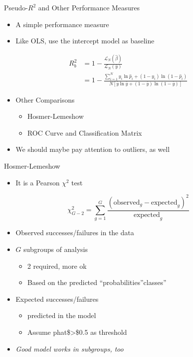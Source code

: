 \documentclass[
  ignorenonframetext,
]{beamer}
\providecommand{\tightlist}{%
  \setlength{\itemsep}{0pt}\setlength{\parskip}{0pt}}
\begin{document}
\begin{frame}{Pseudo-\(R^2\) and Other Performance Measures}
\protect{}\label{pseudo-r2-and-other-performance-measures}
\begin{itemize}
\tightlist
\item
  A simple performance measure
\item
  Like OLS, use the intercept model as baseline
\end{itemize}

\[
\begin{split}
R^2_{b} &=
1-\frac{ \mathcal{L}_N ( \hat{ \beta} )} {\mathcal{L}_N (\overline{y})} \\
 &= 1 - \frac{ \sum_{i=1}^N y_i \ln \hat{p}_i + (1-y_i) \ln
 (1-\hat{p}_i)} {N [ \overline{y} \ln \overline{y} +(1- \overline{y})
 \ln (1-\overline{y} )] }
\end{split}
\]

\begin{itemize}
\tightlist
\item
  Other Comparisons

  \begin{itemize}
  \tightlist
  \item
    Hosmer-Lemeshow
  \item
    ROC Curve and Classification Matrix
  \end{itemize}
\item
  We should maybe pay attention to outliers, as well
\end{itemize}
\end{frame}

\begin{frame}{Hosmer-Lemeshow}
\protect{}\label{hosmer-lemeshow}
\begin{itemize}
\tightlist
\item
  It is a Pearson \(\chi^2\) test
\end{itemize}

\[
\chi_{G-2}^2 = \sum_{g=1}^G \frac{(\text{observed}_g -
  \text{expected}_g)^2}{\text{expected}_g}
\]

\begin{itemize}
\tightlist
\item
  Observed successes/failures in the data
\item
  \(G\) subgroups of analysis

  \begin{itemize}
  \tightlist
  \item
    2 required, more ok
  \item
    Based on the predicted ``probabilities''classes''
  \end{itemize}
\item
  Expected successes/failures

  \begin{itemize}
  \tightlist
  \item
    predicted in the model
  \item
    Assume phat\$\textgreater\$0.5 as threshold
  \end{itemize}
\item
  \emph{Good model works in subgroups, too}
\end{itemize}
\end{frame}
\end{document}
